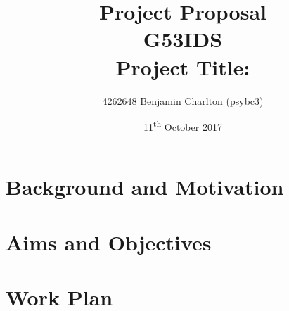 \documentclass{article}
\title{
    Project Proposal
    \\ \large{G53IDS}
    \\ \large{Project Title: }\vspace{-3ex}}
\author{4262648 Benjamin Charlton (psybc3)}
\date{\vspace{-2ex}11\textsuperscript{th} October 2017}
\begin{document}
\maketitle

\section{Background and Motivation}
\lipsum[1]

\section{Aims and Objectives}
\lipsum[1]

\section{Work Plan}
\lipsum[1]

\nocite{bar}


\end{document}
